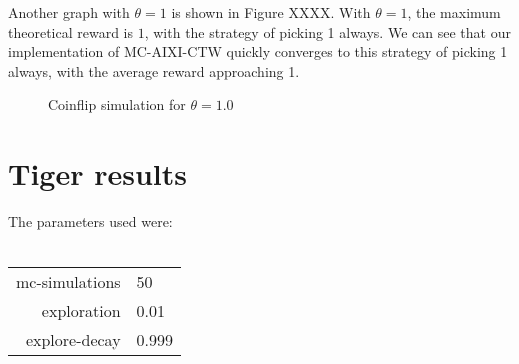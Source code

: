\documentclass[pdftex,twoside,a4paper]{report}
\newcommand{\mac}{MC-AIXI-CTW}
\begin{document}
Another graph with $\theta = 1$ is shown in Figure XXXX. With $\theta = 1$, the maximum theoretical reward is $1$, with the strategy of picking 1 always. We can see that our implementation of \mac{} quickly converges to this strategy of picking 1 always, with the average reward approaching 1.
\begin{figure}
\centering
\caption{Coinflip simulation for $\theta=1.0$}
\label{fig:coin_1_0}
\end{figure}


\section{Tiger results}
The parameters used were:\\\\
\begin{tabular}{| r | l | }
\hline
mc-simulations & 50\\
exploration & 0.01\\
explore-decay & 0.999\\
\hline
\end{tabular}
\end{document}
